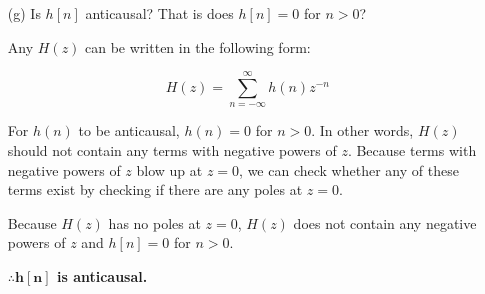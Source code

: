\documentclass[fleqn]{article}
\begin{document}
\begin{enumerate}[nolistsep]
\begin{enumerate} [nolistsep]
					\begin{figure}[H]				
					\centerline{}
					\caption{Pole-Zero Map of H(z)}
					\label{pzmap_h_z_prob_3_48}
					\end{figure}
					
				\end{enumerate}
				
			\item[(g)] Is $h[n]$ anticausal? That is does $h[n] = 0$ for $n > 0$?
			
				Any $H(z)$ can be written in the following form:
				
				\begin{equation*}
					H(z) = \sum_{n = -\infty}^{\infty}h(n)z^{-n}
				\end{equation*}
				
				For $h(n)$ to be anticausal, $h(n) = 0$ for $n > 0$. In other words, $H(z)$ should not contain any terms with negative powers of $z$. Because terms with negative powers of $z$ blow up at $z = 0$, we can check whether any of these terms exist by checking if there are any poles at $z = 0$.
				
				Because $H(z)$ has no poles at $z = 0$, $H(z)$ does not contain any negative powers of $z$ and $h[n] = 0$ for $n > 0$.
				
				\textbf{$\mathbf{\therefore h[n]}$ is anticausal.}
	\end{enumerate}
	
\end{document}
